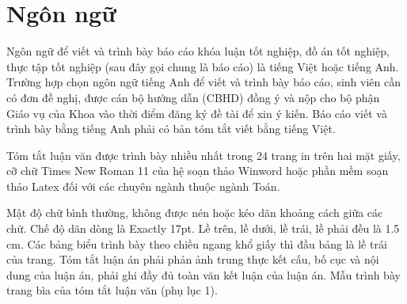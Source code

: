 \chapter{Ngôn ngữ}
\label{Chapter1}

Ngôn ngữ để viết và trình bày báo cáo khóa luận tốt nghiệp, đồ án tốt nghiệp, thực tập tốt nghiệp (sau đây gọi chung là báo cáo) là tiếng Việt hoặc tiếng Anh. 
Trường hợp chọn ngôn ngữ tiếng Anh để viết và trình bày báo cáo,  sinh viên cần có đơn đề nghị, được cán bộ hướng dẫn (CBHD) đồng ý và nộp cho bộ phận Giáo vụ của Khoa vào thời điểm đăng ký đề tài để xin ý kiến.
Báo cáo viết và trình bày bằng tiếng Anh phải có bản tóm tắt viết bằng tiếng Việt.


Tóm tắt luận văn được trình bày nhiều nhất trong 24 trang in trên hai mặt giấy, cỡ chữ Times New Roman 11 của hệ soạn thảo Winword hoặc phần mềm soạn thảo Latex đối với các chuyên ngành thuộc ngành Toán.

Mật độ chữ bình thường, không được nén hoặc kéo dãn khoảng cách giữa các chữ.
Chế độ dãn dòng là Exactly 17pt.
Lề trên, lề dưới, lề trái, lề phải đều là 1.5 cm.
Các bảng biểu trình bày theo chiều ngang khổ giấy thì đầu bảng là lề trái của trang.
Tóm tắt luận án phải phản ảnh trung thực kết cấu, bố cục và nội dung của luận án, phải ghi đầy đủ toàn văn kết luận của luận án.
Mẫu trình bày trang bìa của tóm tắt luận văn (phụ lục 1).